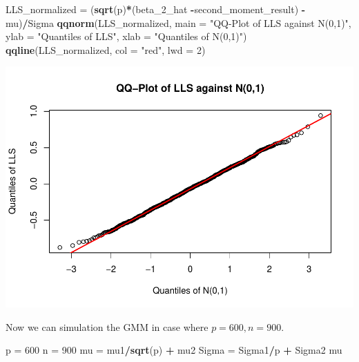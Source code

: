 \documentclass[
]{article}
\newenvironment{Shaded}{\begin{snugshade}}{\end{snugshade}}
\newcommand{\AttributeTok}[1]{\textcolor[rgb]{0.13,0.29,0.53}{#1}}
\newcommand{\DecValTok}[1]{\textcolor[rgb]{0.00,0.00,0.81}{#1}}
\newcommand{\FunctionTok}[1]{\textcolor[rgb]{0.13,0.29,0.53}{\textbf{#1}}}
\newcommand{\NormalTok}[1]{#1}
\newcommand{\OtherTok}[1]{\textcolor[rgb]{0.56,0.35,0.01}{#1}}
\newcommand{\SpecialCharTok}[1]{\textcolor[rgb]{0.81,0.36,0.00}{\textbf{#1}}}
\newcommand{\StringTok}[1]{\textcolor[rgb]{0.31,0.60,0.02}{#1}}
\begin{document}
\begin{Shaded}
\begin{Highlighting}[]
\NormalTok{LLS\_normalized }\OtherTok{=}\NormalTok{ (}\FunctionTok{sqrt}\NormalTok{(p)}\SpecialCharTok{*}\NormalTok{(beta\_2\_hat }\SpecialCharTok{{-}}\NormalTok{second\_moment\_result) }\SpecialCharTok{{-}}\NormalTok{ mu)}\SpecialCharTok{/}\NormalTok{Sigma}
\FunctionTok{qqnorm}\NormalTok{(LLS\_normalized, }\AttributeTok{main =} \StringTok{"QQ{-}Plot of LLS against N(0,1)"}\NormalTok{, }\AttributeTok{ylab =} \StringTok{"Quantiles of LLS"}\NormalTok{, }\AttributeTok{xlab =} \StringTok{"Quantiles of N(0,1)"}\NormalTok{)}
\FunctionTok{qqline}\NormalTok{(LLS\_normalized, }\AttributeTok{col =} \StringTok{"red"}\NormalTok{, }\AttributeTok{lwd =} \DecValTok{2}\NormalTok{)}
\end{Highlighting}
\end{Shaded}

\includegraphics{A5_files/figure-latex/unnamed-chunk-45-1.pdf}

Now we can simulation the GMM in case where \(p =600, n = 900\).

\begin{Shaded}
\begin{Highlighting}[]
\NormalTok{p }\OtherTok{=} \DecValTok{600}
\NormalTok{n }\OtherTok{=} \DecValTok{900}
\NormalTok{mu }\OtherTok{=}\NormalTok{ mu1}\SpecialCharTok{/}\FunctionTok{sqrt}\NormalTok{(p) }\SpecialCharTok{+}\NormalTok{ mu2}
\NormalTok{Sigma }\OtherTok{=}\NormalTok{ Sigma1}\SpecialCharTok{/}\NormalTok{p }\SpecialCharTok{+}\NormalTok{ Sigma2}
\NormalTok{mu}
\end{Highlighting}
\end{Shaded}
\end{document}
